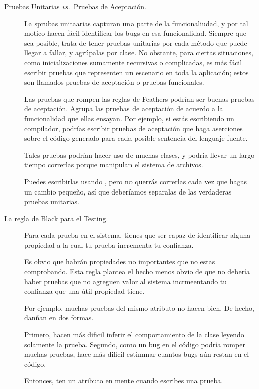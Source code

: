\documentclass[a4paper,10pt,twoside]{book}
\begin{document}
\begin{description}
\item[Pruebas Unitarias \textit{vs.}\ Pruebas de Aceptaci\'on.] La sprubas unitaarias capturan una parte de la funcionaliudad, y por tal motico hacen f\'acil identificar los bugs en esa funcionalidad.
	Siempre que sea posible, trata de tener pruebas unitarias por cada m\'etodo que puede llegar a fallar, y agr\'upalas por clase. No obstante, para ciertas situaciones, como inicializaciones sumamente recursivas o complicadas, es m\'as f\'acil escribir pruebas que representen un escenario en toda la aplicaci\'on; estos son llamados pruebas de aceptaci\'on o pruebas funcionales. 

Las pruebas que rompen las reglas de  Feathers podr\'ian ser buenas pruebas de aceptaci\'on.
	Agrupa las pruebas de aceptaci\'on de acuerdo a la funcionalidad que ellas ensayan.
Por ejemplo, si est\'as escribiendo un compilador, podr\'ias escribir pruebas de aceptaci\'on que haga aserciones
sobre el c\'odigo generado para cada posible sentencia del lenguaje fuente. 

Tales pruebas podr\'ian hacer uso de muchas clases, y podr\'ia llevar un largo tiempo correrlas porque
manipulan el sistema de archivos.

Puedes escribirlas usando \sunit, pero no querr\'as correrlas cada vez que hagas un cambio peque\~no, 
as\'i que deber\'iamos separalas de las verdaderas pruebas unitarias.
 
\item[La regla de Black para el Testing.]

  Para cada prueba en el sistema, tienes que ser capaz de identificar alguna propiedad a la cual tu prueba incrementa tu confianza.

Es obvio que habr\'an propiedades no importantes que no estas comprobando.
Esta regla plantea el hecho menos obvio de que no deber\'ia haber pruebas que no agreguen valor al sistema incrmeentando tu confianza que una \'util propiedad tiene.

Por ejemplo, muchas pruebas del mismo atributo no hacen bien.
De hecho, dan\~nan en dos formas.

Primero, hacen m\'as dificil inferir el comportamiento de la  clase leyendo solamente la prueba.
Segundo, como un bug en el c\'odigo podr\'ia romper muchas pruebas, hace m\'as dificil estimmar cuantos bugs
a\'un restan en el c\'odigo.

Entonces, ten un atributo en mente cuando escribes una prueba.

\end{description}
\end{document}
